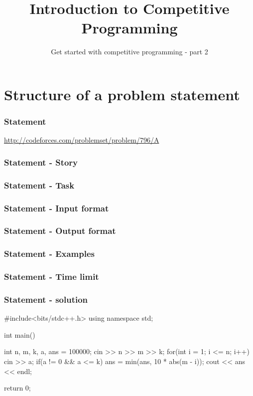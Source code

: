 
\title[Intro to CP]{Introduction to Competitive Programming}
\subtitle[Get started with CP 2]{Get started with competitive programming - part 2}




\section{Structure of a problem statement}
\begin{frame}
    \frametitle{Statement}
    \href{http://codeforces.com/problemset/problem/796/A}{http://codeforces.com/problemset/problem/796/A}
\end{frame}

\begin{frame}
    \frametitle{Statement - Story}
\end{frame}

\begin{frame}
    \frametitle{Statement - Task}
\end{frame}

\begin{frame}
    \frametitle{Statement - Input format}
\end{frame}

\begin{frame}
    \frametitle{Statement - Output format}
\end{frame}

\begin{frame}
    \frametitle{Statement - Examples}
\end{frame}

\begin{frame}
    \frametitle{Statement - Time limit}
\end{frame}

\begin{frame}[fragile]
    \frametitle{Statement - solution}
    \begin{cppcode}
#include<bits/stdc++.h>
using namespace std;

int main() {
    int n, m, k, a, ans = 100000;
    cin >> n >> m >> k;
    for(int i = 1; i <= n; i++) {
        cin >> a;
        if(a != 0 && a <= k) ans = min(ans, 10 * abs(m - i));
    }
    cout << ans << endl;
    
    return 0;
}
    \end{cppcode}
\end{frame}

